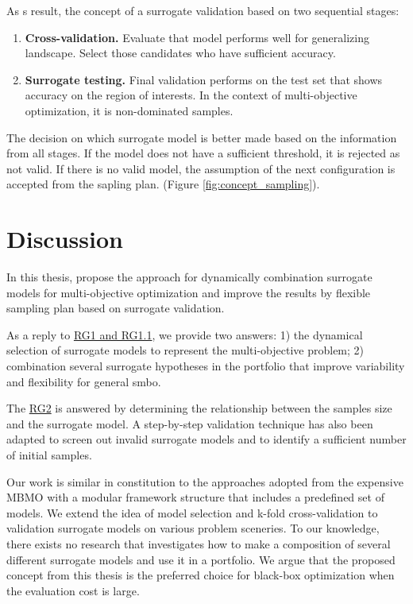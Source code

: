         As s result, the concept of a surrogate validation based on two sequential stages:
        \begin{enumerate}
            \item \textbf{Cross-validation.} Evaluate that model performs well for generalizing landscape. Select those candidates who have sufficient accuracy.
            \item \textbf{Surrogate testing.} Final validation performs on the test set that shows accuracy on the region of interests. In the context of multi-objective optimization, it is non-dominated samples.
        \end{enumerate}
        
        The decision on which surrogate model is better made based on the information from all stages. If the model does not have a sufficient threshold, it is rejected as not valid. If there is no valid model, the assumption of the next configuration is accepted from the sapling plan. (Figure \ref{fig:concept_sampling}).

    

    \section{Discussion}

        In this thesis, propose the approach for dynamically combination surrogate models for multi-objective optimization and improve the results by flexible sampling plan based on surrogate validation.

        As a reply to \hyperref[RG1]{RG1 and RG1.1}, we provide two answers: 1) the dynamical selection of surrogate models to represent the multi-objective problem;  2) combination several surrogate hypotheses in the portfolio that improve variability and flexibility for general \gls{smbo}.
        
        The \hyperref[RG2]{RG2} is answered by determining the relationship between the samples size and the surrogate model. A step-by-step validation technique has also been adapted to screen out invalid surrogate models and to identify a sufficient number of initial samples.

        Our work is similar in constitution to the approaches adopted from the expensive MBMO \cite{SoftSurvey} with a modular framework structure that includes a predefined set of models. We extend the idea of model selection and k-fold cross-validation to validation surrogate models on various problem sceneries. To our knowledge, there exists no research that investigates how to make a composition of several different surrogate models and use it in a portfolio. We argue that the proposed concept from this thesis is the preferred choice for black-box optimization when the evaluation cost is large.

